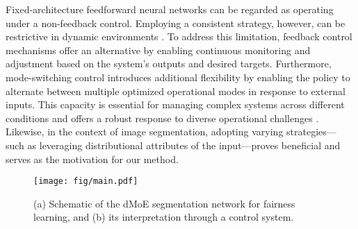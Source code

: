 {Fixed-architecture feedforward neural networks can be regarded as operating under a non-feedback control. Employing a consistent strategy, however, can be restrictive in dynamic environments \cite{aastrom1995adaptive}.}
To address this limitation, feedback control mechanisms \cite{doyle2013feedback, aastrom2021feedback} offer an alternative by enabling continuous monitoring and adjustment based on the system's outputs and desired targets.
Furthermore, mode-switching control \cite{yamaguchi1996mode, boskovic2000multi} introduces additional flexibility by enabling the policy to alternate between multiple optimized operational modes in response to external inputs. This capacity is essential for managing complex systems across different conditions and offers a robust response to diverse operational challenges \cite{yu2017sliding}. %
Likewise, in the context of image segmentation, adopting varying strategies— such as leveraging distributional attributes of the input—proves beneficial and serves as the motivation for our method.





\begin{figure*}[ht]
\vskip 0.2in
\begin{center}
\centerline{\texttt{[image: fig/main.pdf]}}
\caption{(a) Schematic of the dMoE segmentation network for fairness learning, and (b) its interpretation through a control system.}
\label{fig_main}
\end{center}
\vskip -0.2in
\end{figure*}